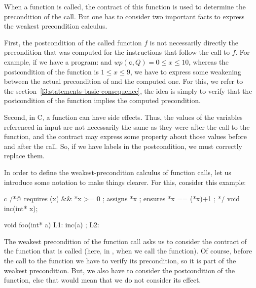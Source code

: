 

When a function is called, the contract of this function is used to determine
the precondition of the call. But one has to consider two important facts to
express the weakest precondition calculus.



First, the postcondition of the called function $f$ is not necessarily
directly the precondition that was computed for the instructions that follow
the call to $f$. For example, if we have a program: 
and $wp(\texttt{c}, Q) = 0 \leq x \leq 10$, whereas the postcondition of the
function  is $1 \leq x \leq 9$, we have to express some
weakening between the actual precondition of  and the computed
one. For this, we refer to the section~\ref{l3:statements-basic-consequence},
the idea is simply to verify that the postcondition of the function implies
the computed precondition.



Second, in C, a function can have side effects. Thus, the values of the
variables referenced in input are not necessarily the same as they were after the
call to the function, and the contract may express some property about those
values before and after the call. So, if we have labels in the postcondition,
we must correctly replace them.



In order to define the weakest-precondition calculus of function calls, let
us introduce some notation to make things clearer. For this, consider this
example:


\begin{CodeBlock}{c}
/*@ requires \valid(x) && *x >= 0 ;
    assigns *x ;
    ensures *x == \old(*x)+1 ; */
void inc(int* x);

void foo(int* a){
  L1:
  inc(a) ;
  L2:
}
\end{CodeBlock}




The weakest precondition of the function call asks us to consider the contract
of the function that is called (here, in , when we call the
 function). Of course, before the call to the function we have
to verify its precondition, so it is part of the weakest precondition. But, we
also have to consider the postcondition of the function, else that would mean
that we do not consider its effect.




